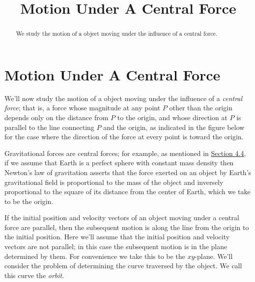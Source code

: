 \documentclass{ximera}
\title{Motion Under A Central Force}%
\begin{document}
\begin{abstract}
We study the motion of a object moving under the influence
of a central force.
\end{abstract}

\maketitle

\section*{Motion Under A Central Force}

We'll now study the motion of a object moving under the influence
of a \textit{central force}; that is, a force whose magnitude at any
point $P$ other than the origin depends only on the distance from
$P$ to the origin, and whose direction at $P$ is parallel to the line
connecting $P$ and the origin, as indicated in
the figure below for the case where the direction of the force
at every point is toward the origin.

\begin{center}
\end{center}


 Gravitational forces are central
forces; for example, as mentioned in \href{https://xerxes.ximera.org/differentialequations/main/secondLawOfMotion/secondLawOfMotion}{Section 4.4}, if we
assume that Earth is a perfect sphere with constant mass density then Newton's law of gravitation asserts that the force exerted on an
object by Earth's gravitational field is proportional to the mass of
the object and inversely proportional to the square of its distance
from the center of Earth, which we take to be the origin.

If the initial position and velocity vectors of an object moving under
a central force are parallel, then the subsequent motion is along the
line from the origin to the initial position. Here we'll assume that
the initial position and velocity vectors are not parallel;   in this
case the subsequent motion is in the plane determined by them. For
convenience we take this to be the $xy$-plane. We'll
consider
the problem of determining the curve traversed by the object. We call
this curve the \textit{orbit}.
\end{document}
